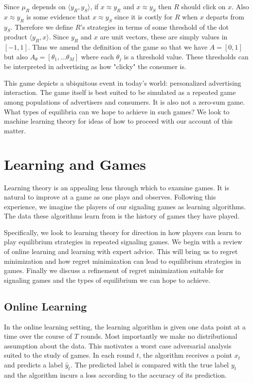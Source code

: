 \documentclass{article}
\begin{document}
Since $\mu_R$ depends on $\langle y_R, y_S \rangle$, if $x \approx y_R$ and $x \approx y_S$ then $R$ should click on $x$. Also $x \approx y_R$ is some evidence that $x \approx y_S$ since it is costly for $R$ when $x$ departs from $y_S$. Therefore we define $R$'s strategies in terms of some threshold of the dot product $\langle y_R, x \rangle$. Since $y_R$ and $x$ are unit vectors, these are simply values in $[-1,1]$. Thus we amend the definition of the game so that we have $A = [0,1]$ but also $A_\theta = [\theta_1,...\theta_M]$ where each $\theta_j$ is a threshold value. These thresholds can be interpreted in advertising as how "clicky" the consumer is.
 
This game depicts a ubiquitous event in today's world: personalized advertising interaction. The game itself is best suited to be simulated as a repeated game among populations of advertisers and consumers. It is also not a zero-sum game. What types of equilibria can we hope to achieve in such games? We look to machine learning theory for ideas of how to proceed with our account of this matter.

\section{Learning and Games}

Learning theory is an appealing lens through which to examine games. It is natural to improve at a game as one plays and observes. Following this experience, we imagine the players of our signaling games as learning algorithms. The data these algorithms learn from is the history of games they have played. 

Specifically, we look to learning theory for direction in how players can learn to play equilibrium strategies in repeated signaling games. We begin with a review of online learning and learning with expert advice. This will bring us to regret minimization and how regret minimization can lead to equilibrium strategies in games. Finally we discuss a refinement of regret minimization suitable for signaling games and the types of equilibrium we can hope to achieve.

\subsection{Online Learning}

In the online learning setting, the learning algorithm is given one data point at a time over the course of $T$ rounds. Most importantly we make no distributional assumption about the data. This motivates a worst case adversarial analysis suited to the study of games. In each round $t$, the algorithm receives a point $x_t$ and predicts a label $\hat y_t$. The predicted label is compared with the true label $y_t$ and the algorithm incurs a loss according to the accuracy of its prediction.
\end{document}
